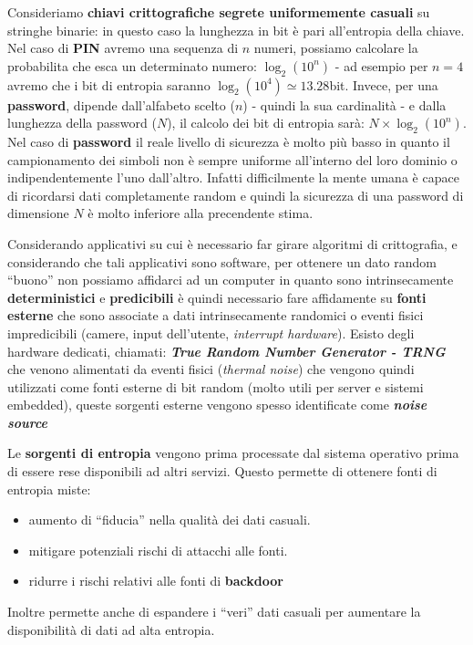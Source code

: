 \begin{flushleft}
    Consideriamo \textbf{chiavi crittografiche segrete uniformemente casuali} su stringhe binarie: in questo caso la lunghezza in bit è pari all'entropia della chiave. Nel caso di \textbf{PIN} avremo una sequenza di $n$ numeri, possiamo calcolare la probabilita che esca un determinato numero: $\log_2(10^n)$ - ad esempio per $n = 4$ avremo che i bit di entropia saranno $\log_2(10^4) \simeq 13.28$bit. Invece, per una \textbf{password}, dipende dall'alfabeto scelto ($n$) - quindi la sua cardinalità - e dalla lunghezza della password ($N$), il calcolo dei bit di entropia sarà: $N \times \log_2(10^n)$. Nel caso di \textbf{password} il reale livello di sicurezza è molto più basso in quanto il campionamento dei simboli non è sempre uniforme all'interno del loro dominio o indipendentemente l'uno dall'altro. Infatti difficilmente la mente umana è capace di ricordarsi dati completamente random e quindi la sicurezza di una password di dimensione $N$ è molto inferiore alla precendente stima.

    \smallskip

    Considerando applicativi su cui è necessario far girare algoritmi di crittografia, e considerando che tali applicativi sono software, per ottenere un dato random ``buono'' non possiamo affidarci ad un computer in quanto sono intrinsecamente \textbf{deterministici} e \textbf{predicibili} è quindi necessario fare affidamente su \textbf{fonti esterne} che sono associate a dati intrinsecamente randomici o eventi fisici impredicibili (camere, input dell'utente, \textit{interrupt hardware}). Esisto degli hardware dedicati, chiamati: \textbf{\textit{True Random Number Generator - TRNG}} che venono alimentati da eventi fisici (\textit{thermal noise}) che vengono quindi utilizzati come fonti esterne di bit random (molto utili per server e sistemi embedded), queste sorgenti esterne vengono spesso identificate come \textbf{\textit{noise source}}
    
    \smallskip

    Le \textbf{sorgenti di entropia} vengono prima processate dal sistema operativo prima di essere rese disponibili ad altri servizi. Questo permette di ottenere fonti di entropia miste:
    \begin{itemize}[nosep]
        \item aumento di ``fiducia'' nella qualità dei dati casuali.
        \item mitigare potenziali rischi di attacchi alle fonti.
        \item ridurre i rischi relativi alle fonti di \textbf{backdoor}
    \end{itemize}
    Inoltre permette anche di espandere i ``veri'' dati casuali per aumentare la disponibilità di dati ad alta entropia.


\end{flushleft}
